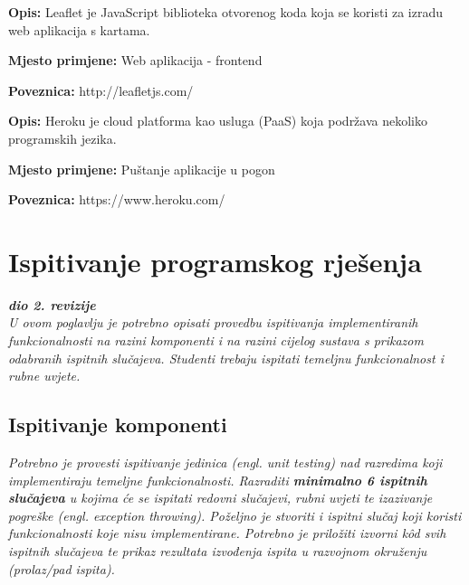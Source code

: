 			\noindent {}
			\begin{packed_item}
				\item  \textbf{Opis:} Leaflet je JavaScript biblioteka otvorenog koda koja se koristi za izradu web aplikacija s kartama.
				\item  \textbf{Mjesto primjene:} Web aplikacija - frontend
				\item  \textbf{Poveznica:} http://leafletjs.com/
			\end{packed_item}
		
			\noindent {}
			\begin{packed_item}
				\item  \textbf{Opis:} Heroku je cloud platforma kao usluga (PaaS) koja podržava nekoliko programskih jezika.
				\item  \textbf{Mjesto primjene:} Puštanje aplikacije u pogon
				\item  \textbf{Poveznica:} https://www.heroku.com/
			\end{packed_item}
			\eject 
		
	
		\section{Ispitivanje programskog rješenja}
			
			\textbf{\textit{dio 2. revizije}}\\
			
			 \textit{U ovom poglavlju je potrebno opisati provedbu ispitivanja implementiranih funkcionalnosti na razini komponenti i na razini cijelog sustava s prikazom odabranih ispitnih slučajeva. Studenti trebaju ispitati temeljnu funkcionalnost i rubne uvjete.}
	
			
			\subsection{Ispitivanje komponenti}
			\textit{Potrebno je provesti ispitivanje jedinica (engl. unit testing) nad razredima koji implementiraju temeljne funkcionalnosti. Razraditi \textbf{minimalno 6 ispitnih slučajeva} u kojima će se ispitati redovni slučajevi, rubni uvjeti te izazivanje pogreške (engl. exception throwing). Poželjno je stvoriti i ispitni slučaj koji koristi funkcionalnosti koje nisu implementirane. Potrebno je priložiti izvorni kôd svih ispitnih slučajeva te prikaz rezultata izvođenja ispita u razvojnom okruženju (prolaz/pad ispita). }
			
			
			
